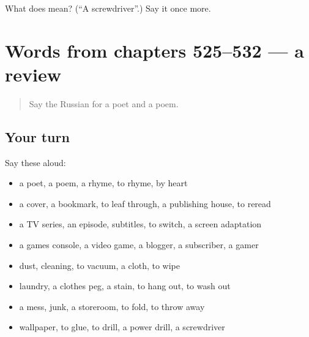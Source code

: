 \begin{tcolorbox}[breakable,colback=teal!4,colframe=teal!35!black,title={Before you move on}]
What does  mean? (\textquotedblleft{}A screwdriver\textquotedblright{}.) Say it once more.
\end{tcolorbox}
\section[(dialogue)]{Words from chapters 525–532 — a review}

\label{lesson:RU-R532-review-525-532}



\begin{quote}
Say the Russian for a poet and a poem.
\end{quote}

\subsection*{Your turn}
Say these aloud:

\begin{itemize}
\raggedright
  \item a poet, a poem, a rhyme, to rhyme, by heart
  \item a cover, a bookmark, to leaf through, a publishing house, to reread
  \item a TV series, an episode, subtitles, to switch, a screen adaptation
  \item a games console, a video game, a blogger, a subscriber, a gamer
  \item dust, cleaning, to vacuum, a cloth, to wipe
  \item laundry, a clothes peg, a stain, to hang out, to wash out
  \item a mess, junk, a storeroom, to fold, to throw away
  \item wallpaper, to glue, to drill, a power drill, a screwdriver
\end{itemize}


